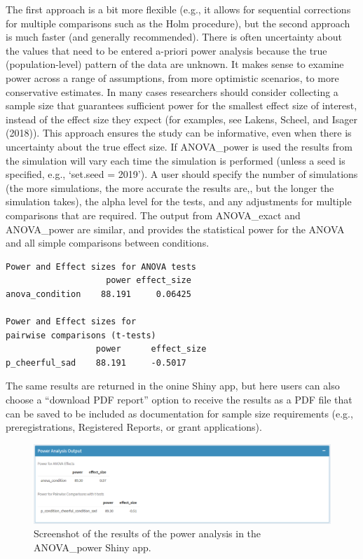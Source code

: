 \documentclass[
  ,jou,floatsintext]{apa6}
\begin{document}
The first approach is a bit more flexible (e.g., it allows for sequential corrections for multiple comparisons such as the Holm procedure), but the second approach is much faster (and generally recommended).
There is often uncertainty about the values that need to be entered a-priori power analysis because the true (population-level) pattern of the data are unknown.
It makes sense to examine power across a range of assumptions, from more optimistic scenarios, to more conservative estimates.
In many cases researchers should consider collecting a sample size that guarantees sufficient power for the smallest effect size of interest, instead of the effect size they expect (for examples, see Lakens, Scheel, and Isager (2018)).
This approach ensures the study can be informative, even when there is uncertainty about the true effect size.
If ANOVA\_power is used the results from the simulation will vary each time the simulation is performed (unless a seed is specified, e.g., `set.seed = 2019').
A user should specify the number of simulations (the more simulations, the more accurate the results are,, but the longer the simulation takes), the alpha level for the tests, and any adjustments for multiple comparisons that are required.
The output from ANOVA\_exact and ANOVA\_power are similar, and provides the statistical power for the ANOVA and all simple comparisons between conditions.

\begin{verbatim}
Power and Effect sizes for ANOVA tests
                    power effect_size
anova_condition    88.191     0.06425

Power and Effect sizes for 
pairwise comparisons (t-tests)
                  power      effect_size
p_cheerful_sad    88.191     -0.5017
\end{verbatim}

The same results are returned in the onine Shiny app, but here users can also choose a \enquote{download PDF report} option to receive the results as a PDF file that can be saved to be included as documentation for sample size requirements (e.g., preregistrations, Registered Reports, or grant applications).

\begin{figure}
\centering
\includegraphics{screenshots/anova_power_result.png}
\caption{Screenshot of the results of the power analysis in the ANOVA\_power Shiny app.}
\end{figure}
\end{document}
